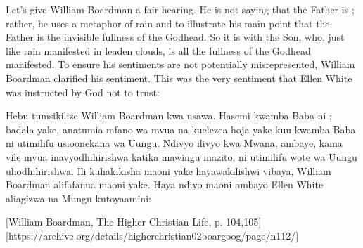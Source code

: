 Let's give William Boardman a fair hearing. He is not saying that the Father is ; rather, he uses a metaphor of rain and  to illustrate his main point that the Father is the invisible fullness of the Godhead. So it is with the Son, who, just like rain manifested in leaden clouds, is all the fullness of the Godhead manifested. To ensure his sentiments are not potentially misrepresented, William Boardman clarified his sentiment. This was the very sentiment that Ellen White was instructed by God not to trust:


Hebu tumsikilize William Boardman kwa usawa. Hasemi kwamba Baba ni ; badala yake, anatumia mfano wa mvua na  kuelezea hoja yake kuu kwamba Baba ni utimilifu usioonekana wa Uungu. Ndivyo ilivyo kwa Mwana, ambaye, kama vile mvua inavyodhihirishwa katika mawingu mazito, ni utimilifu wote wa Uungu uliodhihirishwa. Ili kuhakikisha maoni yake hayawakilishwi vibaya, William Boardman alifafanua maoni yake. Haya ndiyo maoni ambayo Ellen White aliagizwa na Mungu kutoyaamini:


[William Boardman, The Higher Christian Life, p. 104,105][https://archive.org/details/higherchristian02boargoog/page/n112/]


